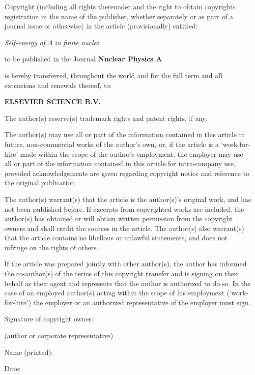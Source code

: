 Copyright (including all rights thereunder and the right to obtain
copyrights registration in the name of the publisher, whether separately or
as part of a journal issue or otherwise) in the article (provisionally)
entitled:


{\it Self-energy of $\Lambda$ in finite nuclei}


to be published in the Journal {\bf Nuclear Physics A}


is hereby transferred, throughout the world and for the full term and all
extensions and renewals thereof, to:

\begin{center}
{\large\bf ELSEVIER SCIENCE B.V.}\\
\end{center}
{\footnotesize{

The author(s) reserve(s) trademark rights and patent rights, if any.


The author(s) may use all or part of the information contained in this
article in future, non-commercial works of the author's own, or, if the
article is a `work-for-hire' made within the scope of the author's
employment, the employer may use all or part of the information contained
in this article for intra-company use, provided acknowledgements are given
regarding copyright notice and reference to the original publication.


The author(s) warrant(s) that the article is the author(s)'s original work,
and has not been published before. If excerpts from copyrighted works are
included, the author(s) has obtained or will obtain written permission
from the copyright owners and shall credit the sources in the article. The
author(s) also warrant(s) that the article contains no libellous or
unlawful statements, and does not infringe on the rights of others.


If the article was prepared jointly with other author(s), the author has
informed the co-author(s) of the terms of this copyright transfer and is
signing on their behalf as their agent and represents that the author is
authorized to do so. In the case of an employed author(s) acting within
the scope of his employment (`work-for-hire') the employer or an
authorized representative of the employer must sign.


Signature of copyright owner:

(author or corporate representative) \dotfill \ 


Name (printed): \dotfill \ 

Date: \dotfill\  }} 

